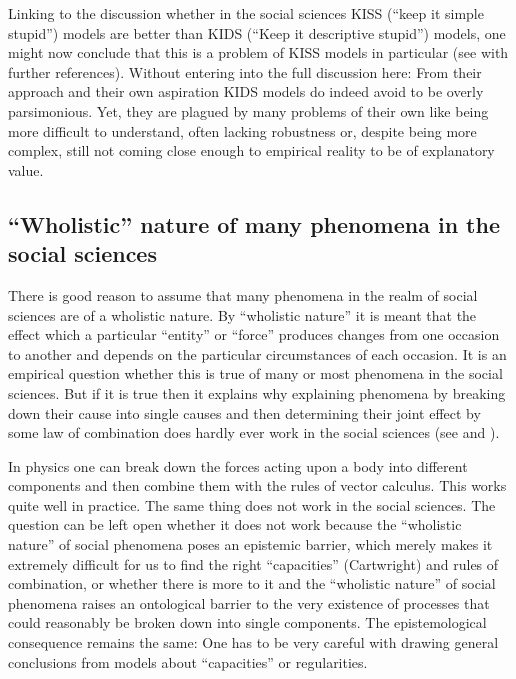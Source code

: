 \documentclass[onecollarge]{STJour}
\numberwithin{equation}{section}
\begin{document}
Linking to the discussion whether in the social sciences KISS (``keep
it simple stupid'') models are better than KIDS (``Keep it
descriptive stupid'') models, one might now conclude that this is a
problem of KISS models in particular (see \citet{pyka-werker:2009}
with further references).
Without entering into the full discussion here: From their 
approach and their own aspiration KIDS models do indeed avoid to be
overly parsimonious. Yet, they are plagued by many problems of
their own like being more difficult to understand, often lacking
robustness or, despite being more complex, still not coming close enough
to empirical reality to be of explanatory value.

\subsection{``Wholistic'' nature of many phenomena in the social
sciences}

There is good reason to assume that many phenomena in the realm of
social sciences are of a wholistic nature. By ``wholistic nature'' it
is meant that the effect which a particular ``entity'' or ``force''
produces changes from one occasion to another and depends on the particular
circumstances of each occasion. It is an empirical question whether
this is true of many or most phenomena in the social sciences. But if
it is true then it explains why explaining phenomena by breaking down
their cause into single causes and then determining their joint effect
by some law of combination does hardly ever work in the social
sciences (see \citet[p.\ 390/391]{alexandrova:2008} and
\citet[p.\ 48ff.]{cartwright:2009}). 

In physics one can break down the forces acting upon a body into
different components and then combine them with the rules of vector
calculus. This works quite well in practice. The same thing does not work
in the social sciences. The question can be left open whether it does not
work because the ``wholistic nature'' of social phenomena poses an
epistemic barrier, which merely makes it extremely difficult for us to
find the right ``capacities'' (Cartwright) and rules of combination, or
whether there is more to it and the ``wholistic nature'' of social
phenomena raises an ontological barrier to the very existence of
processes that could reasonably be broken down into single components.
The epistemological consequence remains the same: One has to be very
careful with drawing general conclusions from models about ``capacities''
or regularities.
\end{document}
